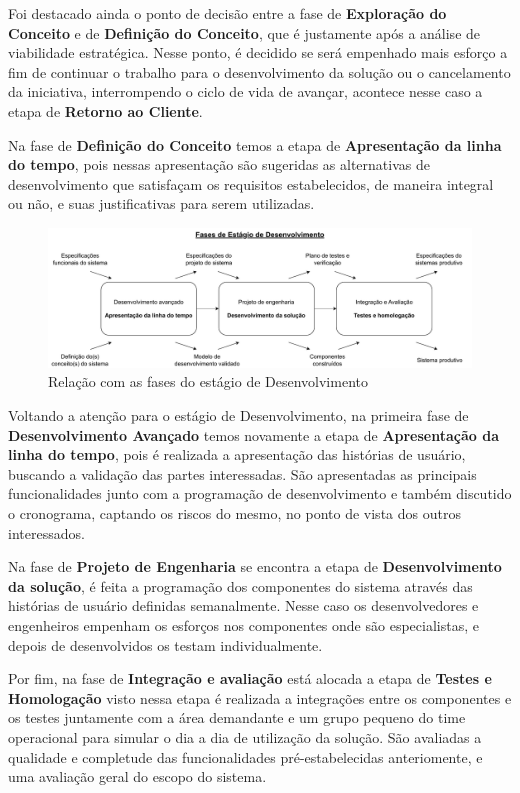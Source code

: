 	Foi destacado ainda o ponto de decisão entre a fase de \textbf{Exploração do Conceito} e de \textbf{Definição do Conceito}, que é justamente após a análise de viabilidade
	estratégica. Nesse ponto, é decidido se será empenhado mais esforço a fim de continuar o trabalho para o desenvolvimento da solução ou o cancelamento da iniciativa, interrompendo o ciclo
	de vida de avançar, acontece nesse caso a etapa de \textbf{Retorno ao Cliente}.

	Na fase de \textbf{Definição do Conceito} temos a etapa de \textbf{Apresentação da linha do tempo}, pois nessas apresentação são sugeridas as alternativas de desenvolvimento que satisfaçam
	os requisitos estabelecidos, de maneira integral ou não, e suas justificativas para serem utilizadas.
	
	\begin{figure}[h]
		\centering
		\includegraphics[width=\textwidth]{./figuras/currentDevelopmentPhases.pdf}
		\caption{Relação com as fases do estágio de Desenvolvimento}
		\label{fig:metodologia:currentDevelopmentPhases}
	\end{figure}

	Voltando a atenção para o estágio de Desenvolvimento, na primeira fase de \textbf{Desenvolvimento Avançado} temos novamente a etapa de \textbf{Apresentação da linha do tempo}, pois é realizada
	a apresentação das histórias de usuário, buscando a validação das partes interessadas. São apresentadas as principais funcionalidades junto com a programação de desenvolvimento e também discutido
	o cronograma, captando os riscos do mesmo, no ponto de vista dos outros interessados.

	Na fase de \textbf{Projeto de Engenharia} se encontra a etapa de \textbf{Desenvolvimento da solução}, é feita a programação dos componentes do sistema através das histórias de usuário definidas semanalmente.
	Nesse caso os desenvolvedores e engenheiros empenham os esforços nos componentes onde são especialistas, e depois de desenvolvidos os testam individualmente.

	Por fim, na fase de \textbf{Integração e avaliação} está alocada a etapa de \textbf{Testes e Homologação} visto nessa etapa é realizada a integrações entre os componentes e os testes juntamente com a
	área demandante e um grupo pequeno do time operacional para simular o dia a dia de utilização da solução. São avaliadas a qualidade e completude das
	funcionalidades pré-estabelecidas anteriomente, e uma avaliação geral do escopo do sistema.

